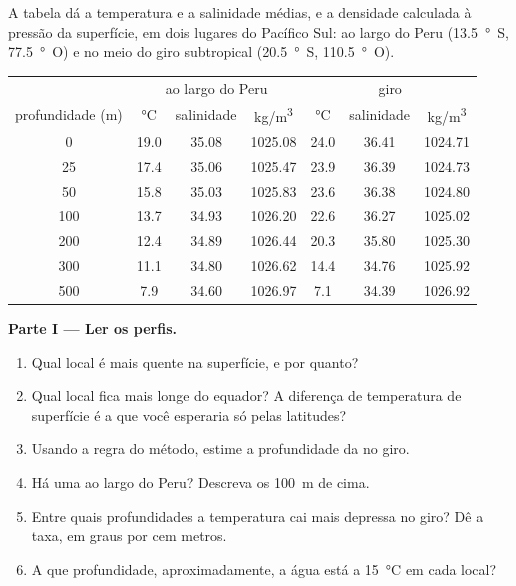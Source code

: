 \begin{problem}
\label{pb:g10:layered-ocean:1}
A tabela dá a temperatura e a salinidade médias, e a densidade calculada à
pressão da superfície, em dois lugares do Pacífico Sul: ao largo do Peru
(\qty{13.5}{\degree S}, \qty{77.5}{\degree O}) e no meio do giro
subtropical (\qty{20.5}{\degree S}, \qty{110.5}{\degree O}).

\begin{center}
\small
\begin{tabular}{c|ccc|ccc}
\hline
 & \multicolumn{3}{c|}{ao largo do Peru} & \multicolumn{3}{c}{giro} \\
profundidade (\unit{m}) & \unit{\degreeCelsius} & salinidade & \unit{kg/m^3} & \unit{\degreeCelsius} & salinidade & \unit{kg/m^3} \\
\hline
0 & 19.0 & 35.08 & 1025.08 & 24.0 & 36.41 & 1024.71 \\
25 & 17.4 & 35.06 & 1025.47 & 23.9 & 36.39 & 1024.73 \\
50 & 15.8 & 35.03 & 1025.83 & 23.6 & 36.38 & 1024.80 \\
100 & 13.7 & 34.93 & 1026.20 & 22.6 & 36.27 & 1025.02 \\
200 & 12.4 & 34.89 & 1026.44 & 20.3 & 35.80 & 1025.30 \\
300 & 11.1 & 34.80 & 1026.62 & 14.4 & 34.76 & 1025.92 \\
500 & 7.9 & 34.60 & 1026.97 & 7.1 & 34.39 & 1026.92 \\
\hline
\end{tabular}
\end{center}

\medskip
\noindent\textbf{Parte I --- Ler os perfis.}
\begin{enumerate}
  \item Qual local é mais quente na superfície, e por quanto?
  \item Qual local fica mais longe do equador? A diferença de temperatura de
        superfície é a que você esperaria só pelas latitudes?
  \item Usando a regra do método, estime a profundidade da 
        no giro.
  \item Há uma  ao largo do Peru? Descreva os \qty{100}{m}
        de cima.
  \item Entre quais profundidades a temperatura cai mais depressa no giro?
        Dê a taxa, em graus por cem metros.
  \item A que profundidade, aproximadamente, a água está a
        \qty{15}{\degreeCelsius} em cada local?
\end{enumerate}


\end{problem}
